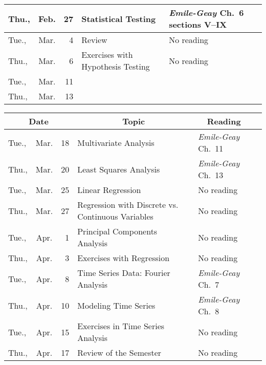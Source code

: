 \documentclass[11pt,twoside]{jgsyllabus}\usepackage[]{graphicx}\usepackage[]{xcolor}
\begin{document}
\begin{center}
\begin{tabular}{l@{~}c@{~}r>{\raggedright}m{2.6in}>{\centering}m{2in}c}
   \midrule
Thu., & Feb. &  27 & Statistical Testing & \emph{Emile-Geay\/} Ch.~6 sections V--IX &  \\ 
   \midrule
Tue., & Mar. &   4 & Review & No reading &  \\ 
   \midrule
Thu., & Mar. &   6 & Exercises with Hypothesis Testing & No reading &  \\ 
   \midrule
Tue., & Mar. &  11 & \multicolumn{2}{l}{\multirow{2}{*}{\bfseries\scshape\Large Spring Break}} & \\%
  Thu., & Mar. &  13 &  &  &  \\ 
   \bottomrule
\end{tabular}

\end{center}
\clearpage

\begin{center}
\begin{tabular}{l@{~}c@{~}r>{\raggedright}m{2.6in}>{\centering}m{2in}c}
  \toprule
  \multicolumn{3}{c}{\bfseries Date} & \multicolumn{1}{c}{\bfseries Topic} &\multicolumn{1}{c}{\bfseries Reading} &\\
 \midrule
Tue., & Mar. &  18 & Multivariate Analysis & \emph{Emile-Geay\/} Ch.~11 &  \\ 
   \midrule
Thu., & Mar. &  20 & Least Squares Analysis & \emph{Emile-Geay\/} Ch.~13 &  \\ 
   \midrule
Tue., & Mar. &  25 & Linear Regression & No reading &  \\ 
   \midrule
Thu., & Mar. &  27 & Regression with Discrete vs. Continuous Variables & No reading &  \\ 
   \midrule
Tue., & Apr. &   1 & Principal Components Analysis & No reading &  \\ 
   \midrule
Thu., & Apr. &   3 & Exercises with Regression & No reading &  \\ 
   \midrule
Tue., & Apr. &   8 & Time Series Data: Fourier Analysis & \emph{Emile-Geay\/} Ch.~7 &  \\ 
   \midrule
Thu., & Apr. &  10 & Modeling Time Series & \emph{Emile-Geay\/} Ch.~8 &  \\ 
   \midrule
Tue., & Apr. &  15 & Exercises in Time Series Analysis & No reading &  \\ 
   \midrule
Thu., & Apr. &  17 & Review of the Semester & No reading &  \\ 
   \bottomrule
\end{tabular}

\end{center}
%
\end{document}
